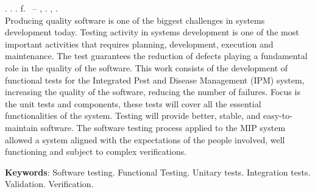 
\begin{resumo}[ABSTRACT]
\begin{SingleSpacing}

\imprimirautorcitacao. \imprimirtitleabstract. \imprimirdata. \pageref {LastPage} f. \imprimirprojeto\ – \imprimirprograma, \imprimirinstituicao. \imprimirlocal, \imprimirdata.\\

Producing quality software is one of the biggest challenges in systems development today. Testing activity in systems development is one of the most important activities that requires planning, development, execution and maintenance. The test guarantees the reduction of defects playing a fundamental role in the quality of the software. This work consists of the development of functional tests for the Integrated Pest and Disease Management (IPM) system, increasing the quality of the software, reducing the number of failures. Focus is the unit tests and components, these tests will cover all the essential functionalities of the system. Testing will provide better, stable, and easy-to-maintain software. The software testing process applied to the MIP system allowed a system aligned with the expectations of the people involved, well functioning and subject to complex verifications.



\textbf{Keywords}: Software testing. Functional Testing. Unitary tests. Integration tests. Validation. Verification.
\end{SingleSpacing}
\end{resumo}

